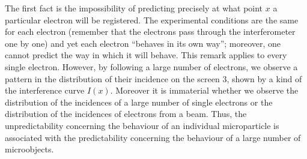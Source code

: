 \documentclass[a4paper,sfsidenotes,colorlinks=true]{tufte-book}
\numberwithin{equation}{section}
\numberwithin{figure}{section}
\begin{document}
The first fact is the impossibility of predicting precisely at what point $x$ a particular electron will be registered. The experimental conditions are the same for each electron (remember that the electrons pass through the interferometer one by one) and yet each electron ``behaves in its own way''; moreover, one cannot predict the way in which it will behave. This remark applies to every single electron. However, by following a large number of electrons, we observe a pattern in the distribution of their incidence on the screen \textsf{3}, shown by a kind of the interference curve $I(x)$. Moreover it is immaterial whether we observe the distribution of the incidences of a large number of single electrons or the distribution of the incidences of electrons from a beam. Thus, the unpredictability concerning the behaviour of an individual microparticle is associated with the predictability concerning the behaviour of a large number of microobjects.
\end{document}
